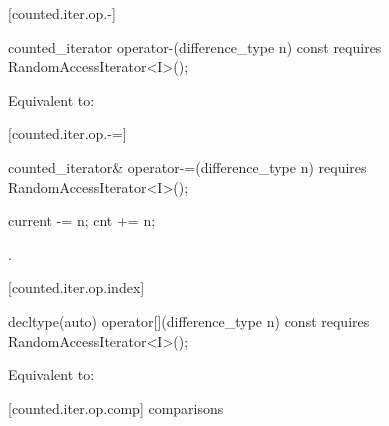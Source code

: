 [counted.iter.op.-]{}

%
%
\begin{itemdecl}
  counted_iterator operator-(difference_type n) const
    requires RandomAccessIterator<I>();
\end{itemdecl}

\begin{itemdescr}
\pnum
\requires {}

\pnum
\effects Equivalent to:
\end{itemdescr}

[counted.iter.op.-=]{}

%
%
\begin{itemdecl}
  counted_iterator& operator-=(difference_type n)
    requires RandomAccessIterator<I>();
\end{itemdecl}

\begin{itemdescr}
\pnum
\requires {}

\pnum
\effects
\begin{codeblock}
current -= n;
cnt += n;
\end{codeblock}

\pnum
\returns {}.
\end{itemdescr}

[counted.iter.op.index]{}

%
%
\begin{itemdecl}
  decltype(auto) operator[](difference_type n) const
    requires RandomAccessIterator<I>();
\end{itemdecl}

\begin{itemdescr}
\pnum
\requires {}

\pnum
\effects Equivalent to:
\end{itemdescr}

[counted.iter.op.comp]{ comparisons}

